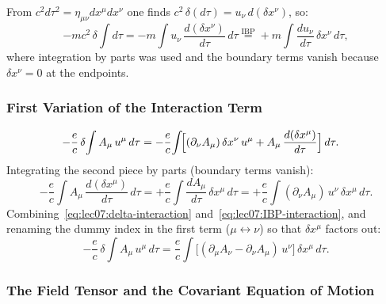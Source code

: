 From $c^2 d\tau^2 = \eta_{\mu\nu}dx^\mu dx^\nu$ one finds
$c^2\,\delta(d\tau) = u_\nu\,d(\delta x^\nu)$, so:
\begin{equation}\label{eq:lec07:delta-ds}
    -mc^2\,\delta\!\int d\tau
    = -m\!\int u_\nu\,\frac{d(\delta x^\nu)}{d\tau}\,d\tau
    \overset{\text{IBP}}{=}
    +m\!\int \frac{du_\nu}{d\tau}\,\delta x^\nu\,d\tau ,
\end{equation}
where integration by parts was used and the boundary terms vanish because
$\delta x^\nu = 0$ at the endpoints.

\subsubsection*{First Variation of the Interaction Term}

\begin{align}
    -\frac{e}{c}\,\delta\!\int A_\mu\,u^\mu\,d\tau
    &= -\frac{e}{c}\!\int\!
       \Bigl[(\partial_\nu A_\mu)\,\delta x^\nu\,u^\mu
       + A_\mu\,\frac{d(\delta x^\mu)}{d\tau}\Bigr]\,d\tau .
    \label{eq:lec07:delta-interaction}
\end{align}
Integrating the second piece by parts (boundary terms vanish):
\begin{equation}\label{eq:lec07:IBP-interaction}
    -\frac{e}{c}\!\int A_\mu\,\frac{d(\delta x^\mu)}{d\tau}\,d\tau
    = +\frac{e}{c}\!\int \frac{dA_\mu}{d\tau}\,\delta x^\mu\,d\tau
    = +\frac{e}{c}\!\int (\partial_\nu A_\mu)\,u^\nu\,\delta x^\mu\,d\tau .
\end{equation}
Combining~\eqref{eq:lec07:delta-interaction} and~\eqref{eq:lec07:IBP-interaction},
and renaming the dummy index in the first term ($\mu \leftrightarrow \nu$) so
that $\delta x^\mu$ factors out:
\begin{equation}\label{eq:lec07:interaction-combined}
    -\frac{e}{c}\,\delta\!\int A_\mu\,u^\mu\,d\tau
    = \frac{e}{c}\!\int
      \bigl[(\partial_\mu A_\nu - \partial_\nu A_\mu)\,u^\nu\bigr]\,\delta x^\mu\,d\tau .
\end{equation}

\subsubsection*{The Field Tensor and the Covariant Equation of Motion}


